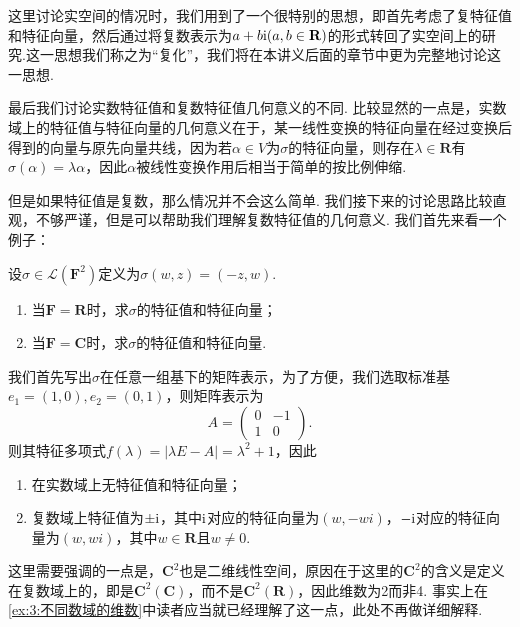 这里讨论实空间的情况时，我们用到了一个很特别的思想，即首先考虑了复特征值和特征向量，然后通过将复数表示为$a+b\textup{i}(a,b\in\mathbf{R})$的形式转回了实空间上的研究.这一思想我们称之为``复化''，我们将在本讲义后面的章节中更为完整地讨论这一思想.

最后我们讨论实数特征值和复数特征值几何意义的不同. 比较显然的一点是，实数域上的特征值与特征向量的几何意义在于，某一线性变换的特征向量在经过变换后得到的向量与原先向量共线，因为若$\alpha\in V$为$\sigma$的特征向量，则存在$\lambda\in\mathbf{R}$有$\sigma(\alpha)=\lambda\alpha$，因此$\alpha$被线性变换作用后相当于简单的按比例伸缩.

但是如果特征值是复数，那么情况并不会这么简单. 我们接下来的讨论思路比较直观，不够严谨，但是可以帮助我们理解复数特征值的几何意义. 我们首先来看一个例子：
\begin{example}
    设$\sigma\in\mathcal{L}(\mathbf{F}^2)$定义为$\sigma(w,z)=(-z,w)$.
    \begin{enumerate}
        \item 当$\mathbf{F}=\mathbf{R}$时，求$\sigma$的特征值和特征向量；

        \item 当$\mathbf{F}=\mathbf{C}$时，求$\sigma$的特征值和特征向量.
    \end{enumerate}
\end{example}

\begin{solution}
    我们首先写出$\sigma$在任意一组基下的矩阵表示，为了方便，我们选取标准基$e_1=(1,0),e_2=(0,1)$，则矩阵表示为
    \[ A=\begin{pmatrix}
            0 & -1 \\ 1 & 0
        \end{pmatrix}. \]
    则其特征多项式$f(\lambda)=|\lambda E-A|=\lambda^2+1$，因此
    \begin{enumerate}
        \item 在实数域上无特征值和特征向量；
        \item 复数域上特征值为$\pm\textup{i}$，其中$\textup{i}$对应的特征向量为$(w,-wi)$，$-\textup{i}$对应的特征向量为$(w,wi)$，其中$w\in\mathbf{R}$且$w\neq 0$.
    \end{enumerate}
\end{solution}

这里需要强调的一点是，$\mathbf{C}^2$也是二维线性空间，原因在于这里的$\mathbf{C}^2$的含义是定义在复数域上的，即是$\mathbf{C}^2(\mathbf{C})$，而不是$\mathbf{C}^2(\mathbf{R})$，因此维数为2而非4. 事实上在\autoref{ex:3:不同数域的维数}中读者应当就已经理解了这一点，此处不再做详细解释.

